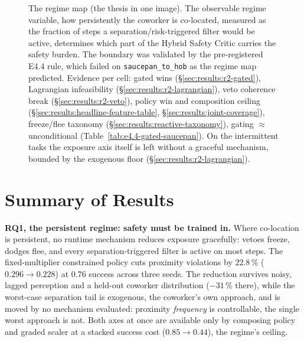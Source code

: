 \documentclass[11pt,a4paper]{report}
\begin{document}
\begin{figure}[htbp]
\caption{The regime map (the thesis in one image). The observable
regime variable, how persistently the coworker is co-located,
measured as the fraction of steps a separation/risk-triggered filter
would be active, determines which part of the Hybrid Safety Critic
carries the safety burden. The boundary was validated by the
pre-registered E4.4 rule, which failed on \texttt{saucepan\_to\_hob} as the
regime map predicted.
Evidence per cell: gated wins
(\S\ref{sec:results:r2-gated}), Lagrangian infeasibility
(\S\ref{sec:results:r2-lagrangian}), veto coherence break
(\S\ref{sec:results:r2-veto}), policy win and composition ceiling
(\S\ref{sec:results:headline-feature-table},
\S\ref{sec:results:joint-coverage}), freeze/flee taxonomy
(\S\ref{sec:results:reactive-taxonomy}), gating $\approx$
unconditional (Table~\ref{tab:e4.4-gated-saucepan}). On the
intermittent tasks the exposure axis itself is left without a
graceful mechanism, bounded by the exogenous floor
(\S\ref{sec:results:r2-lagrangian}).}
\label{fig:regime-map}
\end{figure}

\section{Summary of Results}
\label{sec:results:summary}

\textbf{RQ1, the persistent regime: safety must be trained in.}
Where co-location is persistent, no runtime mechanism reduces
exposure gracefully: vetoes freeze, dodges flee, and every
separation-triggered filter is active on most steps. The
fixed-multiplier constrained policy cuts proximity violations by
$22.8\,\%$ ($0.296 \to 0.228$) at $0.76$ success across three seeds.
The reduction survives noisy, lagged perception and a held-out
coworker distribution ($-31\,\%$ there), while the worst-case
separation tail is exogenous, the coworker's own approach, and is
moved by no mechanism evaluated: proximity \emph{frequency} is
controllable, the single worst approach is not. Both axes at once
are available only by composing policy and graded scaler at a
stacked success cost ($0.85 \to 0.44$), the regime's ceiling.
\end{document}
